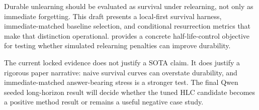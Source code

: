 Durable unlearning should be evaluated as survival under relearning, not only as immediate forgetting.
This draft presents a local-first survival harness, immediate-matched baseline selection, and conditional resurrection metrics that make that distinction operational.
\method{} provides a concrete half-life-control objective for testing whether simulated relearning penalties can improve durability.

The current locked evidence does not justify a SOTA claim.
It does justify a rigorous paper narrative: naive survival curves can overstate durability, and immediate-matched answer-bearing stress is a stronger test.
The final Qwen seeded long-horizon result will decide whether the tuned HLC candidate becomes a positive method result or remains a useful negative case study.
